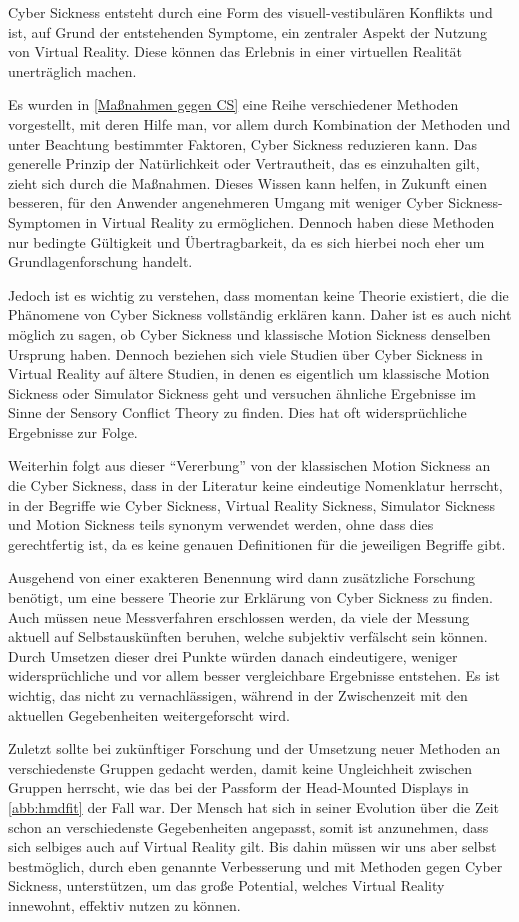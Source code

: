 Cyber Sickness entsteht durch eine Form des visuell-vestibul\"aren Konflikts und ist, auf Grund der entstehenden Symptome, ein zentraler Aspekt der Nutzung von Virtual Reality. Diese k\"onnen das Erlebnis in einer virtuellen Realit\"at unertr\"aglich machen.

Es wurden in \autoref{Maßnahmen gegen CS} eine Reihe verschiedener Methoden vorgestellt, mit deren Hilfe man, vor allem durch Kombination der Methoden und unter Beachtung bestimmter Faktoren, Cyber Sickness reduzieren kann. Das generelle Prinzip der Nat\"urlichkeit oder Vertrautheit, das es einzuhalten gilt, zieht sich durch die Ma{\ss}nahmen.
Dieses Wissen kann helfen, in Zukunft einen besseren, f\"ur den Anwender angenehmeren Umgang mit weniger Cyber Sickness-Symptomen in Virtual Reality zu erm\"oglichen. Dennoch haben diese Methoden nur bedingte G\"ultigkeit und \"Ubertragbarkeit, da es sich hierbei noch eher um Grundlagenforschung handelt.

Jedoch ist es wichtig zu verstehen, dass momentan keine Theorie existiert, die die Ph\"anomene von Cyber Sickness vollst\"andig erkl\"aren kann. Daher ist es auch nicht m\"oglich zu sagen, ob Cyber Sickness und klassische Motion Sickness denselben Ursprung haben. Dennoch beziehen sich viele Studien \"uber Cyber Sickness in Virtual Reality auf \"altere Studien, in denen es eigentlich um klassische Motion Sickness oder Simulator Sickness geht und versuchen \"ahnliche Ergebnisse im Sinne der Sensory Conflict Theory zu finden. Dies hat oft widerspr\"uchliche Ergebnisse zur Folge.

Weiterhin folgt aus dieser "`Vererbung"' von der klassischen Motion Sickness an die Cyber Sickness, dass in der Literatur keine eindeutige Nomenklatur herrscht, in der Begriffe wie Cyber Sickness, Virtual Reality Sickness, Simulator Sickness und Motion Sickness teils synonym verwendet werden, ohne dass dies gerechtfertig ist, da es keine genauen Definitionen f\"ur die jeweiligen Begriffe gibt.

Ausgehend von einer exakteren Benennung wird dann zus\"atzliche Forschung ben\"otigt, um eine bessere Theorie zur Erkl\"arung von Cyber Sickness zu finden. Auch m\"ussen neue Messverfahren erschlossen werden, da viele der Messung aktuell auf Selbstausk\"unften beruhen, welche subjektiv verf\"alscht sein k\"onnen. Durch Umsetzen dieser drei Punkte w\"urden danach eindeutigere, weniger widerspr\"uchliche und vor allem besser vergleichbare Ergebnisse entstehen. Es ist wichtig, das nicht zu vernachl\"assigen, w\"ahrend in der Zwischenzeit mit den aktuellen Gegebenheiten weitergeforscht wird.

Zuletzt sollte bei zuk\"unftiger Forschung und der Umsetzung neuer Methoden an verschiedenste Gruppen gedacht werden, damit keine Ungleichheit zwischen Gruppen herrscht, wie das bei der Passform der Head-Mounted Displays in \autoref{abb:hmdfit} der Fall war. Der Mensch hat sich in seiner Evolution \"uber die Zeit schon an verschiedenste Gegebenheiten angepasst, somit ist anzunehmen, dass sich selbiges auch auf Virtual Reality gilt. Bis dahin m\"ussen wir uns aber selbst bestm\"oglich, durch eben genannte Verbesserung und mit Methoden gegen Cyber Sickness, unterst\"utzen, um das gro{\ss}e Potential, welches Virtual Reality innewohnt, effektiv nutzen zu k\"onnen.
